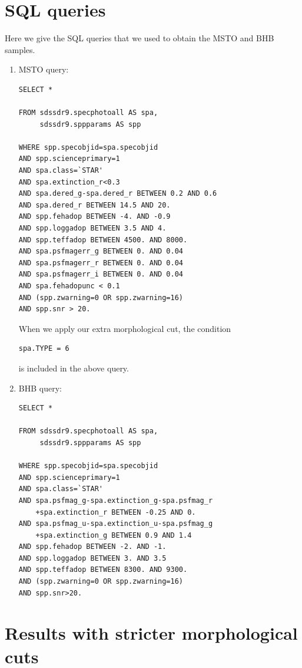 \documentclass[useAMS,twocolumn,usenatbib]{mn2e}
\begin{document}



\appendix

\section{SQL queries}
\label{sec:sql}

Here we give the {\sc SQL} queries that we used to obtain the MSTO and BHB samples.

\begin{enumerate}
\item MSTO query:
%
\begin{verbatim}
SELECT *

FROM sdssdr9.specphotoall AS spa,
     sdssdr9.sppparams AS spp

WHERE spp.specobjid=spa.specobjid
AND spp.scienceprimary=1 
AND spa.class=`STAR' 
AND spa.extinction_r<0.3
AND spa.dered_g-spa.dered_r BETWEEN 0.2 AND 0.6 
AND spa.dered_r BETWEEN 14.5 AND 20. 
AND spp.fehadop BETWEEN -4. AND -0.9 
AND spp.loggadop BETWEEN 3.5 AND 4. 
AND spp.teffadop BETWEEN 4500. AND 8000.
AND spa.psfmagerr_g BETWEEN 0. AND 0.04
AND spa.psfmagerr_r BETWEEN 0. AND 0.04
AND spa.psfmagerr_i BETWEEN 0. AND 0.04
AND spa.fehadopunc < 0.1 
AND (spp.zwarning=0 OR spp.zwarning=16)
AND spp.snr > 20.
\end{verbatim}
When we apply our extra morphological cut, the condition
\begin{verbatim}
spa.TYPE = 6
\end{verbatim}
is included in the above query.
%
\item BHB query:
%
\begin{verbatim}
SELECT * 

FROM sdssdr9.specphotoall AS spa,
     sdssdr9.sppparams AS spp
     
WHERE spp.specobjid=spa.specobjid
AND spp.scienceprimary=1
AND spa.class=`STAR'
AND spa.psfmag_g-spa.extinction_g-spa.psfmag_r
    +spa.extinction_r BETWEEN -0.25 AND 0.
AND spa.psfmag_u-spa.extinction_u-spa.psfmag_g
    +spa.extinction_g BETWEEN 0.9 AND 1.4
AND spp.fehadop BETWEEN -2. AND -1.
AND spp.loggadop BETWEEN 3. AND 3.5
AND spp.teffadop BETWEEN 8300. AND 9300.
AND (spp.zwarning=0 OR spp.zwarning=16)
AND spp.snr>20.
\end{verbatim}
\end{enumerate}

\section{Results with stricter morphological cuts}
\end{document}
